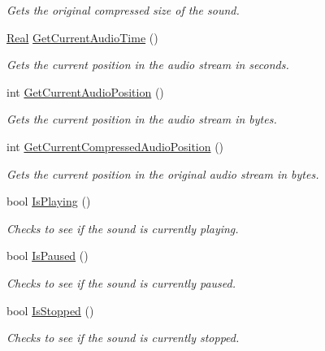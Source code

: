 \begin{DoxyCompactItemize}
\begin{DoxyCompactList}\small\item\em Gets the original compressed size of the sound. \item\end{DoxyCompactList}\item 
\hyperlink{namespacephys_af7eb897198d265b8e868f45240230d5f}{Real} \hyperlink{classphys_1_1Sound_ace3c118ee42540be51dcf64940d4f1e0}{GetCurrentAudioTime} ()
\begin{DoxyCompactList}\small\item\em Gets the current position in the audio stream in seconds. \item\end{DoxyCompactList}\item 
int \hyperlink{classphys_1_1Sound_a0ef4ddd4096758f9c883fe93194b9b3b}{GetCurrentAudioPosition} ()
\begin{DoxyCompactList}\small\item\em Gets the current position in the audio stream in bytes. \item\end{DoxyCompactList}\item 
int \hyperlink{classphys_1_1Sound_adbcd16d55670bc6d97a1ce9b3d22d90c}{GetCurrentCompressedAudioPosition} ()
\begin{DoxyCompactList}\small\item\em Gets the current position in the original audio stream in bytes. \item\end{DoxyCompactList}\item 
bool \hyperlink{classphys_1_1Sound_a382b26fd5289da4fdb2b536e953b7ea0}{IsPlaying} ()
\begin{DoxyCompactList}\small\item\em Checks to see if the sound is currently playing. \item\end{DoxyCompactList}\item 
bool \hyperlink{classphys_1_1Sound_a21ad445ca3e3b4836ee838c41584d8c1}{IsPaused} ()
\begin{DoxyCompactList}\small\item\em Checks to see if the sound is currently paused. \item\end{DoxyCompactList}\item 
bool \hyperlink{classphys_1_1Sound_ac35ba604ca2aaab246e5ce5f524d10f9}{IsStopped} ()
\begin{DoxyCompactList}\small\item\em Checks to see if the sound is currently stopped. \item\end{DoxyCompactList}\item 

\end{DoxyCompactItemize}
